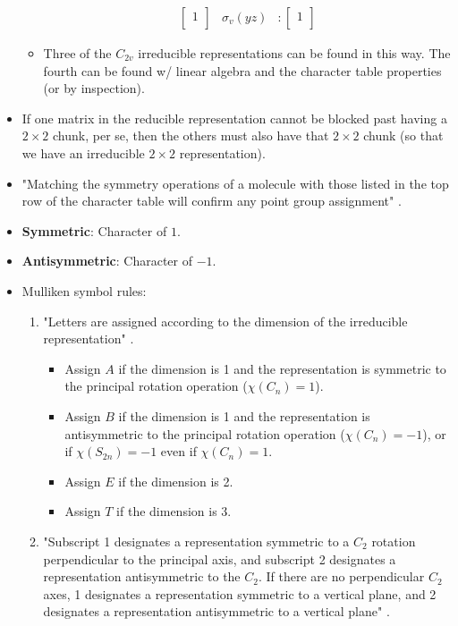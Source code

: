 \documentclass[../notes.tex]{subfiles}
\begin{document}
\begin{itemize}
\begin{itemize}
\begin{align*}
\begin{bmatrix}
                        1\\
                    \end{bmatrix}&
                        \sigma_v(yz) &:
                        \begin{bmatrix}
                            1\\
                        \end{bmatrix}
        \end{align*}
        \item Three of the $C_{2v}$ irreducible representations can be found in this way. The fourth can be found w/ linear algebra and the character table properties (or by inspection).
    \end{itemize}
    \item If one matrix in the reducible representation cannot be blocked past having a $2\times 2$ chunk, per se, then the others must also have that $2\times 2$ chunk (so that we have an irreducible $2\times 2$ representation).
    \item "Matching the symmetry operations of a molecule with those listed in the top row of the character table will confirm any point group assignment" \parencite[99]{bib:MiesslerFischerTarr}.
    \item \textbf{Symmetric}: Character of $1$.
    \item \textbf{Antisymmetric}: Character of $-1$.
    \item Mulliken symbol rules:
    \begin{enumerate}
        \item "Letters are assigned according to the dimension of the irreducible representation" \parencite[99]{bib:MiesslerFischerTarr}.
        \begin{itemize}
            \item Assign $A$ if the dimension is 1 and the representation is symmetric to the principal rotation operation ($\chi(C_n)=1$).
            \item Assign $B$ if the dimension is 1 and the representation is antisymmetric to the principal rotation operation ($\chi(C_n)=-1$), or if $\chi(S_{2n})=-1$ even if $\chi(C_n)=1$.
            \item Assign $E$ if the dimension is 2.
            \item Assign $T$ if the dimension is 3.
        \end{itemize}
        \item "Subscript 1 designates a representation symmetric to a $C_2$ rotation perpendicular to the principal axis, and subscript 2 designates a representation antisymmetric to the $C_2$. If there are no perpendicular $C_2$ axes, 1 designates a representation symmetric to a vertical plane, and 2 designates a representation antisymmetric to a vertical plane" \parencite[100]{bib:MiesslerFischerTarr}.

\end{enumerate}
\end{itemize}
\end{document}
